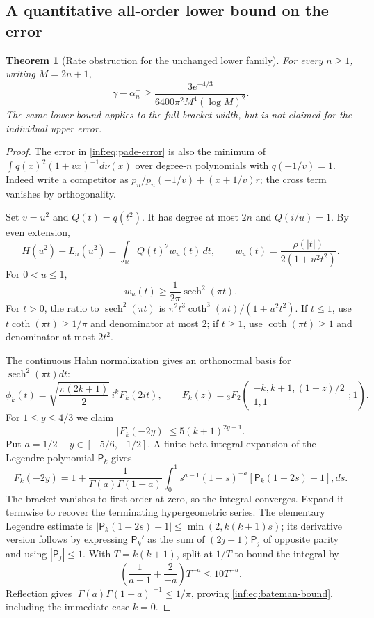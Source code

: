 \documentclass[11pt,a4paper]{article}
\newcommand{\R}{\mathbb R}
\newtheorem{theorem}{Theorem}[section]
\theoremstyle{definition}
\theoremstyle{remark}
\numberwithin{equation}{section}
\begin{document}
\subsection{A quantitative all-order lower bound on the error}
\label{inf:sub:pade-rate}
\begin{theorem}[Rate obstruction for the unchanged lower family]\label{inf:thm:pade-rate}
For every $n\ge1$, writing $M=2n+1$,
\[
 \gamma-\alpha_n^-\ge
 \frac{3e^{-4/3}}{6400\pi^2M^4(\log M)^2}.
\]
The same lower bound applies to the full bracket width, but is not claimed for the individual upper error.
\end{theorem}
\begin{proof}
The error in \eqref{inf:eq:pade-error} is also the minimum of $\int q(x)^2(1+vx)^{-1}d\nu(x)$ over degree-$n$ polynomials with $q(-1/v)=1$. Indeed write a competitor as $p_n/p_n(-1/v)+(x+1/v)r$; the cross term vanishes by orthogonality.

Set $v=u^2$ and $Q(t)=q(t^2)$. It has degree at most $2n$ and $Q(i/u)=1$. By even extension,
\[
 H(u^2)-L_n(u^2)=\int_\R Q(t)^2w_u(t)\,dt,
 \qquad w_u(t)=\frac{\rho(|t|)}{2(1+u^2t^2)}.
\]
For $0<u\le1$,
\begin{equation}\label{inf:eq:hahn-comparison}
 w_u(t)\ge\frac1{2\pi}\operatorname{sech}^2(\pi t).
\end{equation}
For $t>0$, the ratio to $\operatorname{sech}^2(\pi t)$ is $\pi^2t^3\coth^3(\pi t)/(1+u^2t^2)$. If $t\le1$, use $t\coth(\pi t)\ge1/\pi$ and denominator at most $2$; if $t\ge1$, use $\coth(\pi t)\ge1$ and denominator at most $2t^2$.

The continuous Hahn normalization \cite[18.19.2--18.19.4; 18.20.9]{inf:DLMFHahn} gives an orthonormal basis for $\operatorname{sech}^2(\pi t)dt$:
\[
 \phi_k(t)=\sqrt{\frac{\pi(2k+1)}2}\,i^kF_k(2it),\qquad
 F_k(z)={}_3F_2\left(\begin{matrix}-k,k+1,(1+z)/2\\1,1\end{matrix};1\right).
\]
For $1\le y\le4/3$ we claim
\begin{equation}\label{inf:eq:bateman-bound}
 |F_k(-2y)|\le5(k+1)^{2y-1}.
\end{equation}
Put $a=1/2-y\in[-5/6,-1/2]$. A finite beta-integral expansion of the Legendre polynomial $\mathsf P_k$ gives
\[
 F_k(-2y)=1+\frac1{\Gamma(a)\Gamma(1-a)}
   \int_0^1s^{a-1}(1-s)^{-a}[\mathsf P_k(1-2s)-1],ds.
\]
The bracket vanishes to first order at zero, so the integral converges. Expand it termwise to recover the terminating hypergeometric series. The elementary Legendre estimate is
$|\mathsf P_k(1-2s)-1|\le\min(2,k(k+1)s)$; its derivative version follows by expressing $\mathsf P_k'$ as the sum of $(2j+1)\mathsf P_j$ of opposite parity and using $|\mathsf P_j|\le1$. With $T=k(k+1)$, split at $1/T$ to bound the integral by
\[
 \left(\frac1{a+1}+\frac2{-a}\right)T^{-a}\le10T^{-a}.
\]
Reflection gives $|\Gamma(a)\Gamma(1-a)|^{-1}\le1/\pi$, proving \eqref{inf:eq:bateman-bound}, including the immediate case $k=0$.


\end{proof}
\end{document}
